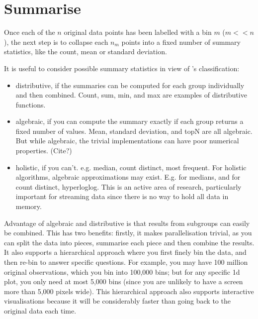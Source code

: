 \documentclass[journal]{vgtc}                %
\begin{document}


\section{Summarise}
\label{sec:summarise}

Once each of the $n$ original data points has been labelled with a bin $m$ ($m << n$), the next step is to collapse each $n_m$ points into a fixed number of summary statistics, like the count, mean or standard deviation.

It is useful to consider possible summary statistics in view of \citep{gray:1997}'s classification:

\begin{itemize}
  \item distributive, if the summaries can be computed for each group individually and then combined. Count, sum, min, and max are examples of distributive functions.
  
  \item algebraic, if you can compute the summary exactly if each group returns a fixed number of values. Mean, standard deviation, and topN are all algebraic. But while algebraic, the trivial implementations can have poor numerical properties. (Cite?)
  
  \item holistic, if you can't. e.g. median, count distinct, most frequent. For holistic algorithms, algebraic approximations may exist. E.g. for medians, and for count distinct, hyperloglog.  This is an active area of research, particularly important for streaming data since there is no way to hold all data in memory.

\end{itemize}

Advantage of algebraic and distributive is that results from subgroups can easily be combined. This has two benefits: firstly, it makes parallelisation trivial, as you can split the data into pieces, summarise each piece and then combine the results. It also supports a hierarchical approach where you first finely bin the data, and then re-bin to answer specific questions. For example, you may have 100 million original observations, which you bin into 100,000 bins; but for any specific 1d plot, you only need at most 5,000 bins (since you are unlikely to have a screen more than 5,000 pixels wide). This hierarchical approach also supports interactive visualisations because it will be considerably faster than going back to the original data each time.
\end{document}
